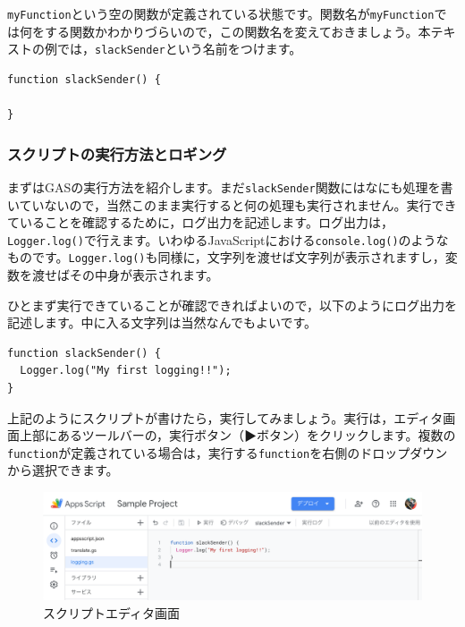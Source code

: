 \documentclass[uplatex,a4j]{jsarticle}
\begin{document}
\verb|myFunction|という空の関数が定義されている状態です。関数名が\verb|myFunction|では何をする関数かわかりづらいので，この関数名を変えておきましょう。本テキストの例では，\verb|slackSender|という名前をつけます。

\begin{lstlisting}[basicstyle=\ttfamily\footnotesize,frame=single,caption=関数名を変更]
function slackSender() {

}
\end{lstlisting}

\subsubsection{スクリプトの実行方法とロギング}

まずはGASの実行方法を紹介します。まだ\verb|slackSender|関数にはなにも処理を書いていないので，当然このまま実行すると何の処理も実行されません。実行できていることを確認するために，ログ出力を記述します。ログ出力は，\verb|Logger.log()|で行えます。いわゆるJavaScriptにおける\verb|console.log()|のようなものです。\verb|Logger.log()|も同様に，文字列を渡せば文字列が表示されますし，変数を渡せばその中身が表示されます。

ひとまず実行できていることが確認できればよいので，以下のようにログ出力を記述します。中に入る文字列は当然なんでもよいです。

\begin{lstlisting}[basicstyle=\ttfamily\footnotesize,frame=single,caption=ロギング]
function slackSender() {
  Logger.log("My first logging!!");
}
\end{lstlisting}


上記のようにスクリプトが書けたら，実行してみましょう。実行は，エディタ画面上部にあるツールバーの，実行ボタン（▶ボタン）をクリックします。複数の\verb|function|が定義されている場合は，実行する\verb|function|を右側のドロップダウンから選択できます。

\begin{figure}[H]
 \centering
 \includegraphics[keepaspectratio, scale=0.5]{images/standalone_gas1.png}
 \caption{スクリプトエディタ画面}
 \label{fig:standalone_gas1}
\end{figure}
\end{document}
